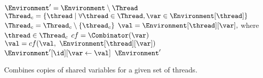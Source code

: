 \begin{algorithm}[t]
	\begin{algorithmic}[1]
		\Function{$\Combine$}{\Environment{}, \Thread{}, \id{}}
			\State $\Environment' = \Environment \setminus \Thread$								\label{algo:Combine_copy_E}
			\ForAll {$\var \in \Shared(\Environment[\Global])$}									
				\State $\Thread_c = \lbrace \thread \mid \forall \thread \in \Thread, \var \in \Environment[\thread] \rbrace$	\label{algo:Combine_find}
					\State $\Thread_c = \Thread_c \setminus \lbrace \thread_c \rbrace$			\label{algo:Combine_remove}
				\EndFor
					\State $\val = \Environment[\thread][\var],$ where $\thread \in \Thread_c$		\label{algo:Combine_init}
					\State $cf = \Combinator(\var)$												\label{algo:Combine_c}
						\State $\val = cf(\val, ~ \Environment[\thread][\var])$					\label{algo:Combine_combine}
					\EndFor
					\State $\Environment'[\id][\var \gets \val]$								\label{algo:Combine_assign}
				\EndIf
			\EndFor
			\State \Return $\Environment'$
		\EndFunction
	\end{algorithmic}
	
	\caption{Combines copies of shared variables for a given set of threads.}
	\label{algo:Combine}
\end{algorithm}

